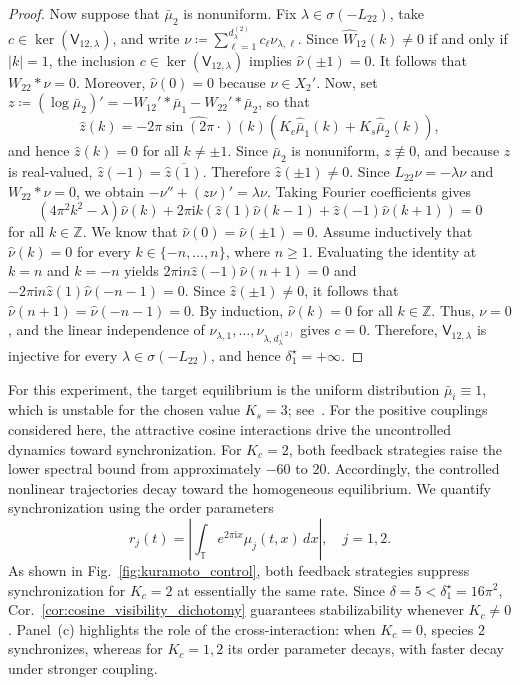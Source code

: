 \documentclass[letterpaper, 10pt, conference]{ieeeconf}
\newcommand{\T}{\mathbb{T}}
\begin{document}
\begin{proof}
    Now suppose that $\bar\mu_2$ is nonuniform.
    Fix $\lambda \in \sigma(-L_{22})$, take $c \in \ker(\mathsf{V}_{12,\lambda})$, and write $\nu \coloneqq \sum_{\ell=1}^{d_\lambda^{(2)}} c_\ell \nu_{\lambda,\ell}$.
    Since $\widehat{W}_{12}(k) \neq 0$ if and only if $|k| = 1$, the inclusion $c \in \ker(\mathsf{V}_{12,\lambda})$ implies $\widehat\nu(\pm 1) = 0$.
    It follows that $W_{22} \ast \nu = 0$.
    Moreover, $\widehat\nu(0) = 0$ because $\nu \in X_2'$.
    Now, set $z \coloneqq (\log\bar\mu_2)' = -W_{12}' \ast \bar\mu_1 - W_{22}' \ast \bar\mu_2$, so that
    \[
    \widehat{z}(k) = -2\pi \widehat{\sin(2\pi \cdot)}(k) \left(K_c \widehat{\bar\mu}_1(k) + K_s \widehat{\bar\mu}_2(k)\right),
    \]
    and hence $\widehat{z}(k) = 0$ for all $k \neq \pm 1$.
    Since $\bar\mu_2$ is nonuniform, $z \not \equiv 0$, and because $z$ is real-valued, $\widehat{z}(-1) = \overline{\widehat{z}(1)}$. 
    Therefore $\widehat{z}(\pm 1) \neq 0$.
    Since $L_{22}\nu = -\lambda\nu$ and $W_{22} \ast \nu = 0$, we obtain $-\nu'' + (z\nu)' = \lambda\nu$.
    Taking Fourier coefficients gives
    \[
    (4\pi^2 k^2 - \lambda) \widehat\nu(k) + 2\pi\mathrm{i} k (\widehat{z}(1) \widehat\nu(k-1) + \widehat{z}(-1) \widehat\nu(k+1)) = 0
    \]
    for all $k \in \mathbb{Z}$.
    We know that $\widehat\nu(0) = \widehat\nu(\pm 1) = 0$.
    Assume inductively that $\widehat\nu(k) = 0$ for every $k \in \{-n, \ldots, n\}$, where $n \ge 1$.
    Evaluating the identity at $k = n$ and $k = -n$ yields $2\pi \mathrm{i} n \widehat{z}(-1) \widehat\nu(n+1) = 0$ and $-2\pi \mathrm{i} n \widehat{z}(1) \widehat\nu(-n-1) = 0$. 
    Since $\widehat{z}(\pm 1) \neq 0$, it follows that $\widehat\nu(n+1) = \widehat\nu(-n-1) = 0$.
    By induction, $\widehat\nu(k) = 0$ for all $k \in \mathbb{Z}$.
    Thus, $\nu = 0$, and the linear independence of $\nu_{\lambda, 1}, \ldots, \nu_{\lambda, d_\lambda^{(2)}}$ gives $c = 0$. 
    Therefore, $\mathsf{V}_{12,\lambda}$ is injective for every $\lambda \in \sigma(-L_{22})$, and hence $\delta_1^\star = +\infty$.
\end{proof}

For this experiment, the target equilibrium is the uniform distribution $\bar\mu_i \equiv 1$, which is unstable for the chosen value $K_s = 3$; see~\cite[Thm.~1.3]{CarrilloSalmaniw2025}.
For the positive couplings considered here, the attractive cosine interactions drive the uncontrolled dynamics toward synchronization.
For $K_c = 2$, both feedback strategies raise the lower spectral bound from approximately $-60$ to $20$.
Accordingly, the controlled nonlinear trajectories decay toward the homogeneous equilibrium.
We quantify synchronization using the order parameters
\[
r_j(t) = \left|\int_\T e^{2\pi \mathrm{i} x} \mu_j(t,x) \, dx\right|, \quad j = 1,2.
\]
As shown in Fig.~\ref{fig:kuramoto_control}, both feedback strategies suppress synchronization for $K_c = 2$ at essentially the same rate.
Since $\delta = 5 < \delta_1^\star = 16\pi^2$, Cor.~\ref{cor:cosine_visibility_dichotomy} guarantees stabilizability whenever $K_c \neq 0$. 
Panel~(c) highlights the role of the cross-interaction: when $K_c = 0$, species $2$ synchronizes, whereas for $K_c = 1, 2$ its order parameter decays, with faster decay under stronger coupling.
\end{document}
